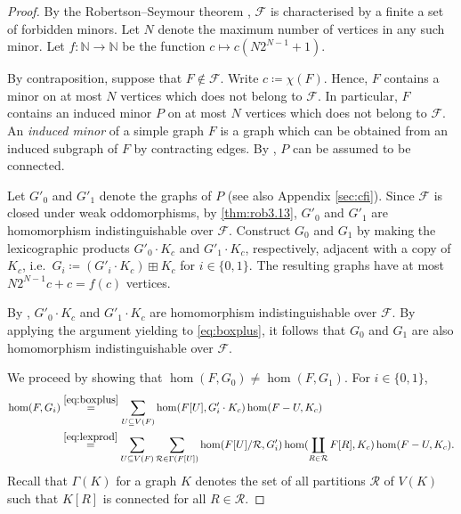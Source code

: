 \documentclass[10pt,a4paper]{article}
\theoremstyle{definition}
\theoremstyle{plain}
\theoremstyle{remark}
\begin{document}
	\begin{proof}
		By the Robertson--Seymour theorem \cite{robertson_graph_2004},
		$\mathcal{F}$ is characterised by a finite a set of forbidden minors. 
		Let $N$ denote the maximum number of vertices in any such minor.
		Let $f \colon \mathbb{N} \to \mathbb{N}$ be the function $c \mapsto c (N2^{N-1} +1)$.
		
		By contraposition,
		suppose that $F \not\in \mathcal{F}$.
		Write $c \coloneqq \chi(F)$.
		Hence, $F$ contains a minor on at most $N$ vertices which does not belong to $\mathcal{F}$.
		In particular, $F$ contains an induced minor $P$ on at most $N$ vertices which does not belong to $\mathcal{F}$.
		An \emph{induced minor} of a simple graph $F$ is a graph which can be obtained from an induced subgraph of $F$ by contracting edges.
		By \cite[Lemma~4]{bulian_fixed-parameter_2017},
		$P$ can be assumed to be connected.
		
		
		Let $G'_0$ and $G'_1$ denote the  graphs of $P$ (see also Appendix \ref{sec:cfi}).
		Since $\mathcal{F}$ is closed under weak oddomorphisms, by \cref{thm:rob3.13},
		$G'_0$ and $G'_1$ are homomorphism indistinguishable over $\mathcal{F}$.
		Construct $G_0$ and $G_1$ by making the lexicographic products $G'_0 \cdot K_c$ and $G'_1 \cdot K_c$, respectively,
		adjacent with a copy of $K_c$, i.e.\ 
		$G_i \coloneqq (G'_i \cdot K_c) \boxplus K_c$ for $i \in \{0,1\}$.
		The resulting graphs have at most $N2^{N-1} c + c = f(c)$ vertices.
		
		By \cite[Theorem~14]{seppelt_logical_2024}, $G'_0 \cdot K_c$ and $G'_1 \cdot K_c$ are
		homomorphism indistinguishable over $\mathcal{F}$.
		By applying the argument yielding \cite[Theorem~14]{seppelt_logical_2024} to \cref{eq:boxplus}, 
		it follows that $G_0$ and $G_1$ are also homomorphism indistinguishable over $\mathcal{F}$.
		
		We proceed by showing that $\hom(F, G_0) \neq  \hom(F, G_1)$.
		For $i \in \{0,1\}$,
		\begin{align}
			\hom(F, G_i)
			&\overset{\eqref{eq:boxplus}}{=} \sum_{U \subseteq V(F)} \hom(F[U], G'_i \cdot K_c) \hom(F - U, K_c) \notag \\
			&\overset{\eqref{eq:lexprod}}{=} \sum_{U \subseteq V(F)} \sum_{\mathcal{R} \in \Gamma(F[U])} \hom(F[U]/\mathcal{R}, G'_i) \hom(\coprod_{R \in \mathcal{R}} F[R], K_c) \hom(F - U, K_c). \label{eq:lem-induced-minor}
		\end{align}
		Recall that $\Gamma(K)$ for a graph $K$ denotes the set of all partitions $\mathcal{R}$ of $V(K)$ such that $K[R]$ is connected for all $R \in \mathcal{R}$.
		

\end{proof}
\end{document}
